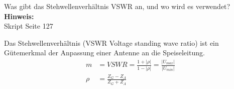 \begin{question}[section=11,name={Stehwellenverhältnis VSWR},difficulty=,quantity=,type=thr,tags={20151210}]
	Was gibt das Stehwellenverhältnis VSWR an, und wo wird es verwendet?
	\\ \textbf{Hinweis:}\\
	Skript Seite 127
\end{question}
\begin{solution}
	Das Stehwellenverhältnis (VSWR Voltage standing wave ratio) ist ein Gütemerkmal der Anpassung einer Antenne an die Speiseleitung.
	\begin{align}
		m &= VSWR = \frac{1 + |\rho|}{1 - |\rho|} = \frac{|U_{max}|}{|U_{min}|}\\
		\rho &= \frac{Z_G -Z_A}{Z_G + Z_A}
	\end{align}
\end{solution}